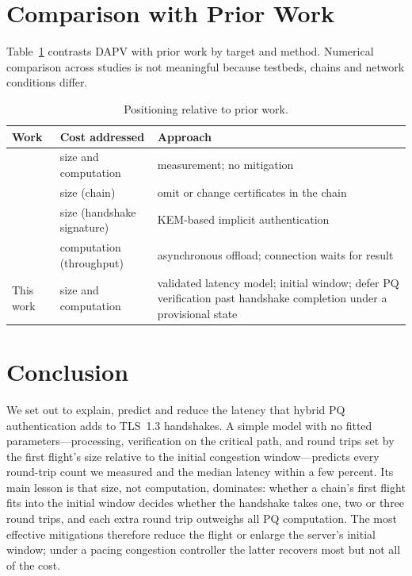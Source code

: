 \documentclass[preprint,10pt,3p]{elsarticle}
\begin{document}
\section{Comparison with Prior Work}
\label{sec:comparison}

Table~\ref{tab:priorwork} contrasts DAPV with prior work by target and
method.  Numerical comparison across studies is not meaningful because
testbeds, chains and network conditions differ.

\begin{table}[t]
\centering
\caption{Positioning relative to prior work.}
\label{tab:priorwork}
\small
\begin{tabular}{p{3.6cm}p{3.6cm}p{6.2cm}}
\toprule
\textbf{Work} & \textbf{Cost addressed} & \textbf{Approach} \\
\midrule
\cite{Paquin2020,Sikeridis2020a,Sikeridis2020b,Sosnowski2023,Montenegro2026}
  & size and computation & measurement; no mitigation \\
\cite{KampanakisKallitsis2022,Sikeridis2022ICA,Paul2022}
  & size (chain) & omit or change certificates in the chain \\
\cite{Schwabe2020KEMTLS,Schwabe2021,WiggersIETF2024}
  & size (handshake signature) & KEM-based implicit authentication \\
\cite{Hu2019QTLS}
  & computation (throughput) & asynchronous offload; connection waits for result \\
This work & size and computation & validated latency model; initial window;
  defer PQ verification past handshake completion under a provisional
  state \\
\bottomrule
\end{tabular}
\end{table}

\section{Conclusion}
\label{sec:conclusion}

We set out to explain, predict and reduce the latency that hybrid PQ
authentication adds to TLS~1.3 handshakes.  A simple model with no fitted
parameters---processing, verification on the critical path, and round
trips set by the first flight's size relative to the initial congestion
window---predicts every round-trip count we measured and the median
latency within a few percent.  Its main lesson is that size, not
computation, dominates: whether a chain's first flight fits into the
initial window decides whether the handshake takes one, two or three round
trips, and each extra round trip outweighs all PQ computation.  The most
effective mitigations therefore reduce the flight or enlarge the server's
initial window; under a pacing congestion controller the latter recovers
most but not all of the cost.
\end{document}
